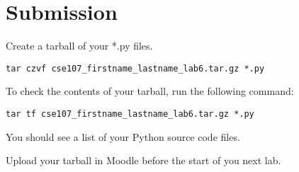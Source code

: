 \documentclass[12pt]{article}
\begin{document}





\section*{Submission}

Create a tarball of your *.py files.

\begin{lstlisting}[style=bash]
tar czvf cse107_firstname_lastname_lab6.tar.gz *.py
\end{lstlisting}


To check the contents of your tarball, run the following command:

\begin{lstlisting}[style=bash]
tar tf cse107_firstname_lastname_lab6.tar.gz *.py
\end{lstlisting}

You should see a list of your Python source code files.

Upload your tarball in Moodle before the start of you next lab.
\end{document}
